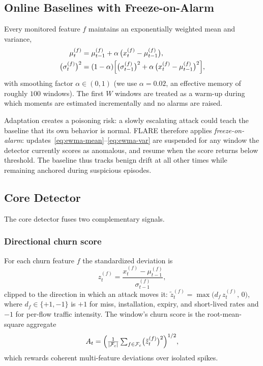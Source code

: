 \documentclass[conference]{IEEEtran}
\begin{document}
\subsection{Online Baselines with Freeze-on-Alarm}
Every monitored feature $f$ maintains an exponentially weighted mean and
variance,
\begin{align}
\mu_t^{(f)} &= \mu_{t-1}^{(f)} + \alpha\,\bigl(x_t^{(f)} - \mu_{t-1}^{(f)}\bigr),
\label{eq:ewma-mean}\\
\bigl(\sigma_t^{(f)}\bigr)^2 &= (1-\alpha)\Bigl[\bigl(\sigma_{t-1}^{(f)}\bigr)^2
 + \alpha\,\bigl(x_t^{(f)} - \mu_{t-1}^{(f)}\bigr)^2\Bigr],
\label{eq:ewma-var}
\end{align}
with smoothing factor $\alpha \in (0,1)$ (we use $\alpha = 0.02$, an effective
memory of roughly $100$ windows). The first $W$ windows are treated as a warm-up
during which moments are estimated incrementally and no alarms are raised.

Adaptation creates a poisoning risk: a slowly escalating attack could teach the
baseline that its own behavior is normal. FLARE therefore applies
\emph{freeze-on-alarm}: updates~\eqref{eq:ewma-mean}--\eqref{eq:ewma-var} are
suspended for any window the detector currently scores as anomalous, and resume
when the score returns below threshold. The baseline thus tracks benign drift
at all other times while remaining anchored during suspicious episodes.

\subsection{Core Detector}
The core detector fuses two complementary signals.

\subsubsection{Directional churn score}
For each churn feature $f$ the standardized deviation is
\begin{equation}
z_t^{(f)} = \frac{x_t^{(f)} - \mu_{t-1}^{(f)}}{\sigma_{t-1}^{(f)}},
\label{eq:zscore}
\end{equation}
clipped to the direction in which an attack moves it:
$\tilde z_t^{(f)} = \max\bigl(d_f\, z_t^{(f)},\, 0\bigr)$, where
$d_f \in \{+1, -1\}$ is $+1$ for miss, installation, expiry, and short-lived
rates and $-1$ for per-flow traffic intensity. The window's churn score is the
root-mean-square aggregate
\begin{equation}
A_t = \Bigl(\tfrac{1}{|\mathcal{F}_c|}
      \textstyle\sum_{f \in \mathcal{F}_c} \bigl(\tilde z_t^{(f)}\bigr)^2
      \Bigr)^{1/2},
\label{eq:rms}
\end{equation}
which rewards coherent multi-feature deviations over isolated spikes.
\end{document}
